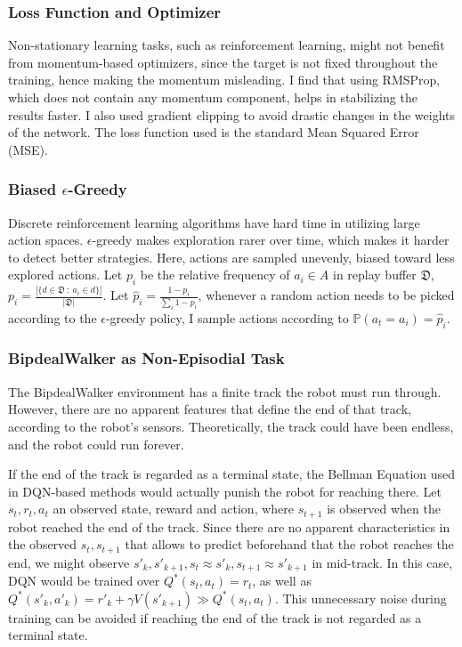 \documentclass{article}
\begin{document}
\begin{multicols}{2}
\subsubsection{Loss Function and Optimizer}
Non-stationary learning tasks, such as reinforcement learning, might not benefit from momentum-based optimizers, since the target is not fixed throughout the training, hence making the momentum misleading. I find that using RMSProp, which does not contain any momentum component, helps in stabilizing the results faster. I also used gradient clipping to avoid drastic changes in the weights of the network. The loss function used is the standard Mean Squared Error (MSE).

\subsubsection{Biased $\epsilon$-Greedy}
Discrete reinforcement learning algorithms have hard time in utilizing large action spaces. $\epsilon$-greedy makes exploration rarer over time, which makes it harder to detect better strategies. Here, actions are sampled unevenly, biased toward less explored actions. Let $p_i$ be the relative frequency of $a_i \in A$ in replay buffer $\mathfrak{D}$, $p_i = \frac{|\{d \in \mathfrak{D}\ :\ a_i \in d \}|}{|\mathfrak{D}|}$.
Let $\hat{p}_i = \frac{1 - p_i}{\sum_i 1 - p_i}$, whenever a random action needs to be picked according to the $\epsilon$-greedy policy, I sample actions according to $\mathbb{P}(a_t = a_i) = \hat{p}_i$.

\subsubsection{BipdealWalker as Non-Episodial Task}
The BipdealWalker environment has a finite track the robot must run through. However, there are no apparent features that define the end of that track, according to the robot's sensors. Theoretically, the track could have been endless, and the robot could run forever. 

If the end of the track is regarded as a terminal state, the Bellman Equation used in DQN-based methods would actually punish the robot for reaching there. 
Let $s_t, r_t, a_t$ an observed state, reward and action, where $s_{t+1}$ is observed when the robot reached the end of the track. Since there are no apparent characteristics in the observed $s_t, s_{t+1}$ that allows to predict beforehand that the robot reaches the end, we might observe $s'_k, s'_{k+1}, s_t \approx s'_k, s_{t+1} \approx s'_{k+1}$ in mid-track. In this case, DQN would be trained over $Q^*(s_t, a_t) = r_t$, as well as $Q^*(s'_k, a'_k) = r'_k + \gamma V(s'_{k+1}) \gg Q^*(s_t, a_t)$. This unnecessary noise during training can be avoided if reaching the end of the track is not regarded as a terminal state.


\end{multicols}
\end{document}
